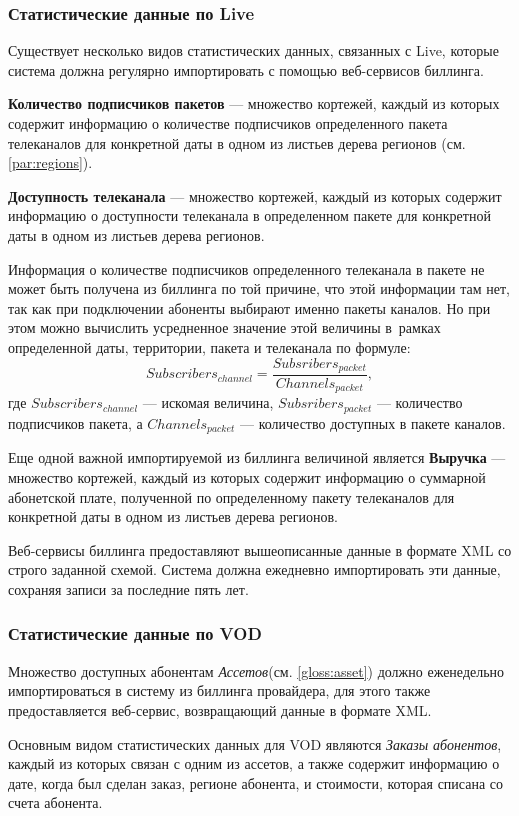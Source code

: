 \subsubsection{Статистические данные по Live}
Существует несколько видов статистических данных, связанных с Live, которые система должна регулярно импортировать
с помощью веб-сервисов биллинга.

\textbf{Количество подписчиков пакетов} --- множество кортежей, каждый из которых содержит информацию о количестве подписчиков
определенного пакета телеканалов для конкретной даты в одном из листьев дерева регионов (см. \ref{par:regions}).

\textbf{Доступность телеканала} --- множество кортежей, каждый из которых содержит информацию о доступности телеканала в
определенном пакете для конкретной даты в одном из листьев дерева регионов.

\label{stat:subscribers}
Информация о количестве подписчиков определенного телеканала в пакете не может быть получена из биллинга по той причине, что этой информации там нет, 
так как при подключении абоненты выбирают именно пакеты каналов. Но при этом можно вычислить усредненное значение этой величины 
в~рамках определенной даты, территории, пакета и телеканала по формуле:
$$Subscribers_{channel} = \frac{Subsribers_{packet}} {Channels_{packet}}, $$
где $Subscribers_{channel}$ --- искомая величина,  $Subsribers_{packet}$ --- количество подписчиков пакета, 
а $Channels_{packet}$ --- количество доступных в пакете каналов.

Еще одной важной импортируемой из биллинга величиной является \textbf{Выручка} --- множество кортежей, каждый из которых содержит информацию о
суммарной абонетской плате, полученной по определенному пакету телеканалов для конкретной даты в одном из листьев дерева регионов.
 
Веб-сервисы биллинга предоставляют вышеописанные данные в формате XML со строго заданной схемой. Система должна ежедневно импортировать эти данные,
сохраняя записи за последние пять лет.

\subsubsection{Статистические данные по VOD}
Множество доступных абонентам \textit{Ассетов}(см. \ref{gloss:asset}) должно еженедельно импортироваться в систему из 
биллинга провайдера, для этого также предоставляется веб-сервис, возвращающий данные в формате XML.

Основным видом статистических данных для VOD являются \textit{Заказы абонентов}, каждый из которых связан с одним из ассетов,
а также содержит информацию о дате, когда был сделан заказ, регионе абонента, и стоимости, которая списана со счета абонента.

